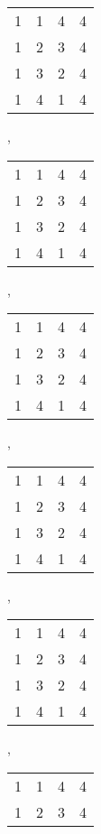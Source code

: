 \documentclass{article}
\theoremstyle{plain}
\theoremstyle{definition}
\begin{document}
\begin{figure}
\renewcommand{\arraystretch}{0.3}
\begin{center}
\begin{tabular}{@{}c@{}c@{}c@{}c@{}}
1&1&4&4\\
1&2&3&4\\
1&3&2&4\\
1&4&1&4\\
\end{tabular},\ \ \ 
\begin{tabular}{@{}c@{}c@{}c@{}c@{}}
1&1&\color{lgr}4&4\\
1&2&\color{lgr}3&4\\
\color{lgr}1&\color{lgr}3&\color{lgr}2&\color{lgr}4\\
1&4&\color{lgr}1&4\\
\end{tabular},\ \ \ 
\begin{tabular}{@{}c@{}c@{}c@{}c@{}}
\color{lgr}1&\color{lgr}1&\color{lgr}4&\color{lgr}4\\
\color{lgr}1&2&\color{lgr}3&4\\
\color{lgr}1&\color{lgr}3&\color{lgr}2&\color{lgr}4\\
\color{lgr}1&4&\color{lgr}1&4\\
\end{tabular},\ \ \ 
\begin{tabular}{@{}c@{}c@{}c@{}c@{}}
\color{lgr}1&\color{lgr}1&\color{lgr}4&\color{lgr}4\\
\color{lgr}1&\color{lgr}2&\color{lgr}3&\color{lgr}4\\
\color{lgr}1&\color{lgr}3&\color{lgr}2&\color{lgr}4\\
\color{lgr}1&\color{lgr}4&\color{lgr}1&4\\
\end{tabular},\ \ \ 
\begin{tabular}{@{}c@{}c@{}c@{}c@{}}
1&1&\color{lgr}4&\color{lgr}4\\
1&2&\color{lgr}3&\color{lgr}4\\
\color{lgr}1&\color{lgr}3&\color{lgr}2&\color{lgr}4\\
\color{lgr}1&\color{lgr}4&\color{lgr}1&\color{lgr}4\\
\end{tabular},\ \ \ 
\begin{tabular}{@{}c@{}c@{}c@{}c@{}}
1&\color{lgr}1&\color{lgr}4&4\\
\color{lgr}1&\color{lgr}2&\color{lgr}3&\color{lgr}4\\

\end{tabular}
\end{center}
\end{figure}
\end{document}
